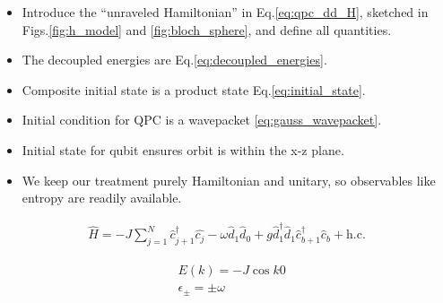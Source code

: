 \documentclass[10pt,
 amsmath,amssymb,
 aps,prb, twocolumn
]{revtex4-2}
\begin{document}
\begin{itemize}
    \item Introduce the ``unraveled Hamiltonian'' in Eq.\eqref{eq:qpc_dd_H}, sketched in Figs.\ref{fig:h_model} and \ref{fig:bloch_sphere}, and define all quantities.
    \item The decoupled energies are Eq.\eqref{eq:decoupled_energies}.
    \item Composite initial state is a product state Eq.\eqref{eq:initial_state}.
    \item Initial condition for QPC is a wavepacket \eqref{eq:gauss_wavepacket}.
    \item Initial state for qubit ensures orbit is within the x-z plane.
    \item We keep our treatment purely Hamiltonian and unitary, so observables like entropy are readily available.


\end{itemize}

\begin{align}\label{eq:qpc_dd_H}
    \hat{H} = -J \sum_{j=1}^N \hat{c}^{\dagger}_{j+1}\hat{c_{j}} - \omega \hat{d}_1 \hat{d}_0  + g \hat{d}^{\dagger}_{1}\hat{d}_{1}\hat{c}^{\dagger}_{b+1}\hat{c}_{b}  + \text{h.c.}
\end{align}

\begin{align}\label{eq:decoupled_energies}
    & E(k) = -J \cos{k0} \\
    & \epsilon_\pm = \pm \omega
\end{align}
\end{document}
